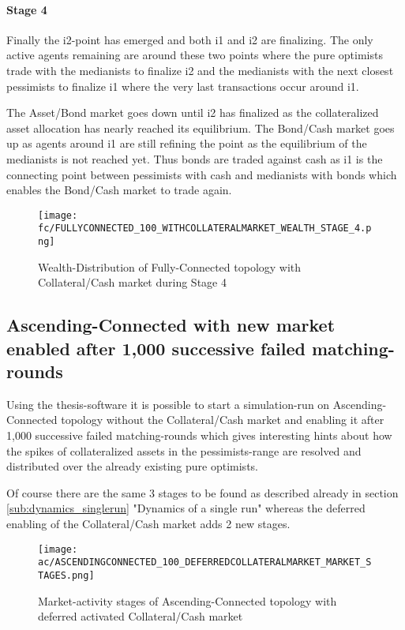 \documentclass[Bachelorarbeit.tex]{subfiles}
\begin{document}
\paragraph{Stage 4}
Finally the i2-point has emerged and both i1 and i2 are finalizing. The only active agents remaining are around these two points where the pure optimists trade with the medianists to finalize i2 and the medianists with the next closest pessimists to finalize i1 where the very last transactions occur around i1.

\medskip

The Asset/Bond market goes down until i2 has finalized as the collateralized asset allocation has nearly reached its equilibrium. The Bond/Cash market goes up as agents around i1 are still refining the point as the equilibrium of the medianists is not reached yet. Thus bonds are traded against cash as i1 is the connecting point between pessimists with cash and medianists with bonds which enables the Bond/Cash market to trade again.

\begin{figure}[H]
	\centering
  \texttt{[image: fc/FULLYCONNECTED\_100\_WITHCOLLATERALMARKET\_WEALTH\_STAGE\_4.png]}
  	\caption{Wealth-Distribution of Fully-Connected topology with Collateral/Cash market during Stage 4}
	\label{fig:markets_FULLYCONNECTED_100_WITHCOLLATERALMARKET_WEALTH_STAGE_4}
\end{figure}

\subsection{Ascending-Connected with new market enabled after 1,000 successive failed matching-rounds}
Using the thesis-software it is possible to start a simulation-run on Ascending-Connected topology without the Collateral/Cash market and enabling it after 1,000 successive failed matching-rounds which gives interesting hints about how the spikes of collateralized assets in the pessimists-range are resolved and distributed over the already existing pure optimists.

\medskip

Of course there are the same 3 stages to be found as described already in section \ref{sub:dynamics_singlerun} "Dynamics of a single run" whereas the deferred enabling of the Collateral/Cash market adds 2 new stages.

\begin{figure}[H]
	\centering
  \texttt{[image: ac/ASCENDINGCONNECTED\_100\_DEFERREDCOLLATERALMARKET\_MARKET\_STAGES.png]}
  	\caption{Market-activity stages of Ascending-Connected topology with deferred activated Collateral/Cash market}
	\label{fig:markets_ASCENDINGCONNECTED_100_DEFERREDCOLLATERALMARKET_MARKET_STAGES}
\end{figure}
\end{document}
